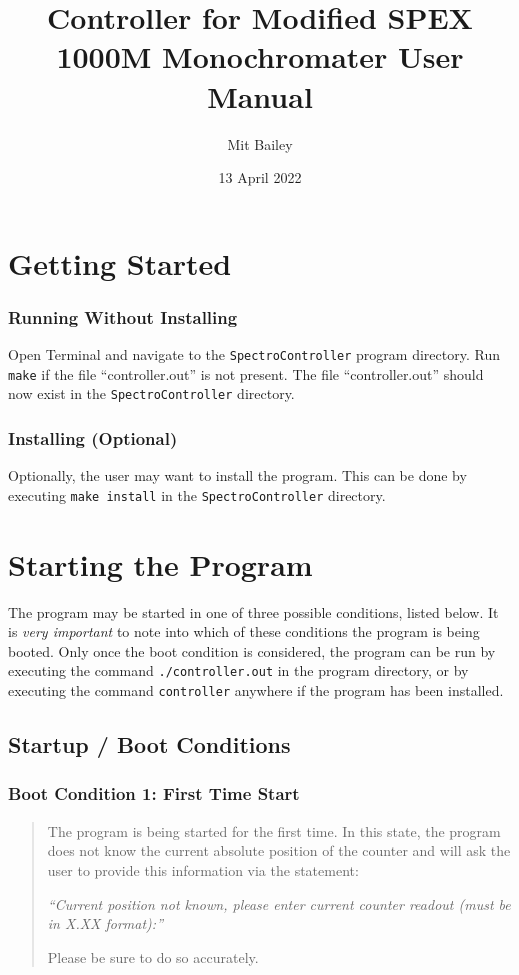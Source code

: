 \documentclass{article}
\title{Controller for Modified SPEX 1000M Monochromater User Manual}
\author{Mit Bailey}
\date{13 April 2022}
\begin{document}
\maketitle
\newpage

\tableofcontents
\newpage

\section{Getting Started} \label{section:gettingstarted}

\subsubsection{Running Without Installing}
Open Terminal and navigate to the \verb|SpectroController| program directory. Run \verb|make| if the file ``controller.out'' is not present. The file ``controller.out'' should now exist in the \verb|SpectroController| directory.

\subsubsection{Installing (Optional)}
Optionally, the user may want to install the program. This can be done by executing \verb|make install| in the \verb|SpectroController| directory.

\section{Starting the Program} \label{section:startingtheprogram}

The program may be started in one of three possible conditions, listed below. It is \emph{very important} to note into which of these conditions the program is being booted. Only once the boot condition is considered, the program can be run by executing the command \verb|./controller.out| in the program directory, or by executing the command \verb|controller| anywhere if the program has been installed.

\subsection{Startup / Boot Conditions} \label{subsection:startupbootconditions}
\subsubsection{Boot Condition 1: First Time Start} \label{subsubsection:bootcon1}
\begin{quote}
    The program is being started for the first time. In this state, the program does not know the current absolute position of the counter and will ask the user to provide this information via the statement:
    
    \emph{“Current position not known, please enter current counter readout (must be in X.XX format):”}
    
    Please be sure to do so accurately.
\end{quote}
\end{document}
